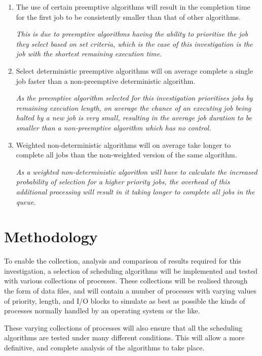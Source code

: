 \documentclass{acm_proc_article-sp}
\begin{document}
\begin{enumerate}

\item The use of certain preemptive algorithms will result in the completion time for the first job to be consistently smaller than that of other algorithms. 

\textit{This is due to preemptive algorithms having the ability to prioritise the job they select based on set criteria, which is the case of this investigation is the job with the shortest remaining execution time.}

\item Select deterministic preemptive algorithms will on average complete a single job faster than a non-preemptive deterministic algorithm.

\textit{As the preemptive algorithm selected for this investigation prioritises jobs by remaining execution length, on average the chance of an executing job being halted by a new job is very small, resulting in the average job duration to be smaller than a non-preemptive algorithm which has no control.}

\item Weighted non-deterministic algorithms will on average take longer to complete all jobs than the non-weighted version of the same algorithm.

\textit{As a weighted non-deterministic algorithm will have to calculate the increased probability of selection for a higher priority jobs, the overhead of this additional processing will result in it taking longer to complete all jobs in the queue.}

\end{enumerate}
 

\section{Methodology}
To enable the collection, analysis and comparison of results required for this investigation, a selection of scheduling algorithms will be implemented and tested with various collections of processes. These collections will be realised through the form of data files, and will contain a number of processes with varying values of priority, length, and I/O blocks to simulate as best as possible the kinds of processes normally handled by an operating system or the like. 

These varying collections of processes will also ensure that all the scheduling algorithms are tested under many different conditions. This will allow a more definitive, and complete analysis of the algorithms to take place. 
\end{document}
